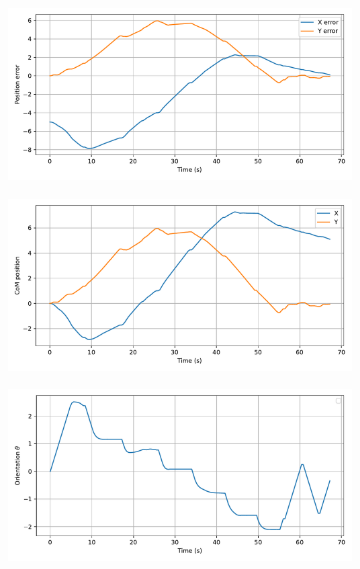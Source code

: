 \begin{figure}[H]
    \centering
    \begin{subfigure}{0.45\linewidth}
        \centering
        \includegraphics[width=\linewidth]{figures/Simulations/sim_rrt/evolution_0.pdf}
    \end{subfigure}
    \begin{subfigure}{0.45\linewidth}
        \centering
        \includegraphics[width=\linewidth]{figures/Simulations/sim_rrt/evolution_4.pdf}
    \end{subfigure}
    \hfill
    \begin{subfigure}{0.45\linewidth}
        \centering
        \includegraphics[width=\linewidth]{figures/Simulations/sim_rrt/evolution_2.pdf}

\end{subfigure}
\end{figure}
